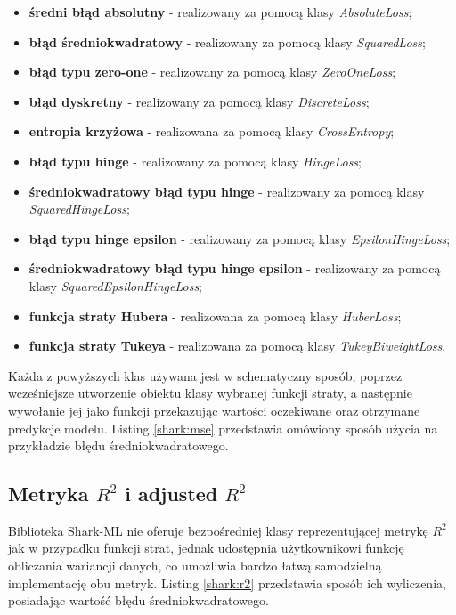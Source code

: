 \begin{itemize}
	\item \textbf{średni błąd absolutny} - realizowany za pomocą klasy \textit{AbsoluteLoss};
	\item \textbf{błąd średniokwadratowy} - realizowany za pomocą klasy \textit{SquaredLoss};
	\item \textbf{błąd typu zero-one} - realizowany za pomocą klasy \textit{ZeroOneLoss};
	\item \textbf{błąd dyskretny} - realizowany za pomocą klasy \textit{DiscreteLoss};
	\item \textbf{entropia krzyżowa} - realizowana za pomocą klasy \textit{CrossEntropy};
	\item \textbf{błąd typu hinge} - realizowany za pomocą klasy \textit{HingeLoss};
	\item \textbf{średniokwadratowy błąd typu hinge} - realizowany za pomocą klasy \textit{SquaredHingeLoss};
	\item \textbf{błąd typu hinge epsilon} - realizowany za pomocą klasy \textit{EpsilonHingeLoss};
	\item \textbf{średniokwadratowy błąd typu hinge epsilon} - realizowany za pomocą klasy \textit{SquaredEpsilonHingeLoss};
	\item \textbf{funkcja straty Hubera} - realizowana za pomocą klasy \textit{HuberLoss};
	\item \textbf{funkcja straty Tukeya} - realizowana za pomocą klasy \textit{TukeyBiweightLoss}.
\end{itemize}

Każda z powyższych klas używana jest w schematyczny sposób, poprzez wcześniejsze utworzenie obiektu klasy wybranej funkcji straty, a następnie wywołanie jej jako funkcji przekazując wartości oczekiwane oraz otrzymane predykcje modelu. Listing \ref{shark:mse} przedstawia omówiony sposób użycia na przykładzie błędu średniokwadratowego.


\subsection{Metryka $R^2$ i adjusted $R^2$}

Biblioteka Shark-ML nie oferuje bezpośredniej klasy reprezentującej metrykę $R^2$ jak w przypadku funkcji strat, jednak udostępnia użytkownikowi funkcję obliczania wariancji danych, co umożliwia bardzo łatwą samodzielną implementację obu metryk. Listing \ref{shark:r2} przedstawia sposób ich wyliczenia, posiadając wartość błędu średniokwadratowego.

